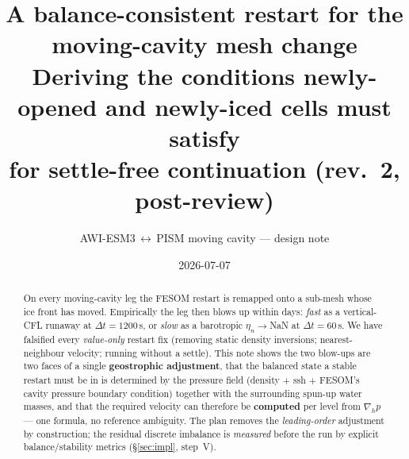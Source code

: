 \documentclass[11pt,a4paper]{article}
\title{\vspace{-1.5em}\textbf{A balance-consistent restart for the moving-cavity mesh change}\\[0.3em]
\large Deriving the conditions newly-opened and newly-iced cells must satisfy\\
for settle-free continuation \quad (rev.~2, post-review)}
\author{AWI-ESM3\,$\leftrightarrow$\,PISM moving cavity --- design note}
\date{2026-07-07}
\begin{document}
\maketitle

\begin{center}\end{center}

\begin{abstract}
\noindent
On every moving-cavity leg the FESOM restart is remapped onto a sub-mesh whose ice front has
moved. Empirically the leg then blows up within days: \emph{fast} as a vertical-CFL runaway at
$\Delta t=1200$\,s, or \emph{slow} as a barotropic $\eta_n\!\to\!$NaN at $\Delta t=60$\,s. We have
falsified every \emph{value-only} restart fix (removing static density inversions; nearest-neighbour
velocity; running without a settle). This note shows the two blow-ups are two faces of a single
\textbf{geostrophic adjustment}, that the balanced state a stable restart must be in is determined
by the pressure field (density $+$ ssh $+$ FESOM's cavity pressure boundary condition) together
with the surrounding spun-up water masses, and that the required velocity can therefore be
\textbf{computed} per level from $\nabla_h p$ --- one formula, no reference ambiguity. The plan
removes the \emph{leading-order} adjustment by construction; the residual discrete imbalance is
\emph{measured} before the run by explicit balance/stability metrics (\S\ref{sec:impl}, step~V).
\end{abstract}
\end{document}
